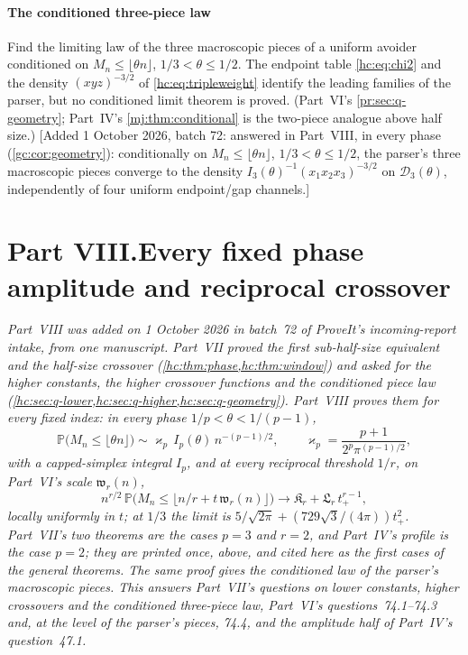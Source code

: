 \documentclass[11pt,a4paper]{article}
\theoremstyle{definition}\newaliascnt{definition}{theorem}
\theoremstyle{remark}\newaliascnt{remark}{theorem}
\newcommand{\ljP}{\mathbb P}
\begin{document}
\subsection{The conditioned three-piece law}
\label{hc:sec:q-geometry}
Find the limiting law of the three macroscopic pieces of a uniform avoider
conditioned on $M_n\le\lfloor\theta n\rfloor$, $1/3<\theta\le1/2$. The
endpoint table \eqref{hc:eq:chi2} and the density $(xyz)^{-3/2}$ of
\eqref{hc:eq:tripleweight} identify the leading families of the parser, but
no conditioned limit theorem is proved. (Part~VI's
\cref{pr:sec:q-geometry}; Part~IV's \cref{mj:thm:conditional} is the
two-piece analogue above half size.)
[Added 1 October 2026, batch 72: answered in Part~VIII, in every phase
(\cref{gc:cor:geometry}): conditionally on $M_n\le\lfloor\theta n\rfloor$,
$1/3<\theta\le1/2$, the parser's three macroscopic pieces converge to the
density $I_3(\theta)^{-1}(x_1x_2x_3)^{-3/2}$ on $\mathcal D_3(\theta)$,
independently of four uniform endpoint/gap channels.]


\clearpage
{}\part*{Part VIII.\quad Every fixed phase amplitude and reciprocal crossover}

\noindent\emph{Part~VIII was added on 1 October 2026 in batch~72 of
ProveIt's incoming-report intake, from one manuscript. Part~VII proved the
first sub-half-size equivalent and the half-size crossover
(\cref{hc:thm:phase,hc:thm:window}) and asked for the higher constants, the
higher crossover functions and the conditioned piece law
(\cref{hc:sec:q-lower,hc:sec:q-higher,hc:sec:q-geometry}). Part~VIII proves
them for every fixed index: in every phase $1/p<\theta<1/(p-1)$,
\[
 \ljP\bigl(M_n\le\lfloor\theta n\rfloor\bigr)\sim
 \varkappa_p\,I_p(\theta)\,n^{-(p-1)/2},\qquad
 \varkappa_p=\frac{p+1}{2^p\pi^{(p-1)/2}},
\]
with a capped-simplex integral $I_p$, and at every reciprocal threshold
$1/r$, on Part~VI's scale $\mathfrak w_r(n)$,
\[
 n^{r/2}\,\ljP\bigl(M_n\le\lfloor n/r+t\,\mathfrak w_r(n)\rfloor\bigr)
 \longrightarrow\mathfrak K_r+\mathfrak L_r\,t_+^{r-1},
\]
locally uniformly in $t$; at $1/3$ the limit is
$5/\sqrt{2\pi}+(729\sqrt3/(4\pi))t_+^2$. Part~VII's two theorems are the cases
$p=3$ and $r=2$, and Part~IV's profile is the case $p=2$; they are printed
once, above, and cited here as the first cases of the general theorems. The
same proof gives the conditioned law of the parser's macroscopic pieces. This
answers Part~VII's questions on lower constants, higher crossovers and the
conditioned three-piece law, Part~VI's questions~74.1--74.3 and, at the level
of the parser's pieces, 74.4, and the amplitude half of Part~IV's
question~47.1.}
\end{document}
